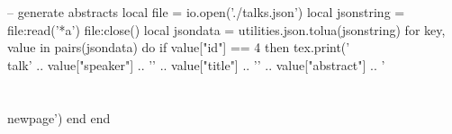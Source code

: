 \begin{luacode}
  -- generate abstracts
  local file = io.open('./talks.json')
  local jsonstring = file:read('*a')
  file:close()
  local jsondata =  utilities.json.tolua(jsonstring)
  for key, value in pairs(jsondata) do
    if value["id"] == 4 then 
        tex.print('\\talk{' .. 
          value["speaker"]  .. 
          '}{'              .. 
          value["title"]    .. 
          '}{'              .. 
          value["abstract"] .. 
          '}\\\\[1em] \\newpage')
    end
  end
\end{luacode}